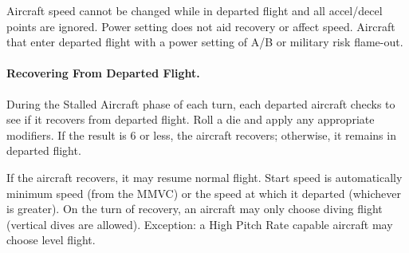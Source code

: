 Aircraft speed cannot be changed while in departed flight and all accel/decel points are ignored. Power setting does not aid recovery or affect speed. Aircraft that enter departed flight with a power setting of A/B or military risk flame-out.

\paragraph{Recovering From Departed Flight.} 
During the Stalled Aircraft phase of each turn, each departed aircraft checks to see if it recovers from departed flight. Roll a die and apply any appropriate modifiers. If the result is 6 or less, the aircraft recovers; otherwise, it remains in departed flight.

If the aircraft recovers, it may resume normal flight. Start speed is automatically minimum speed (from the MMVC) or the speed at which it departed (whichever is greater). On the turn of recovery, an aircraft may only choose diving flight (vertical dives are allowed). Exception: a High Pitch Rate capable aircraft may choose level flight.   

